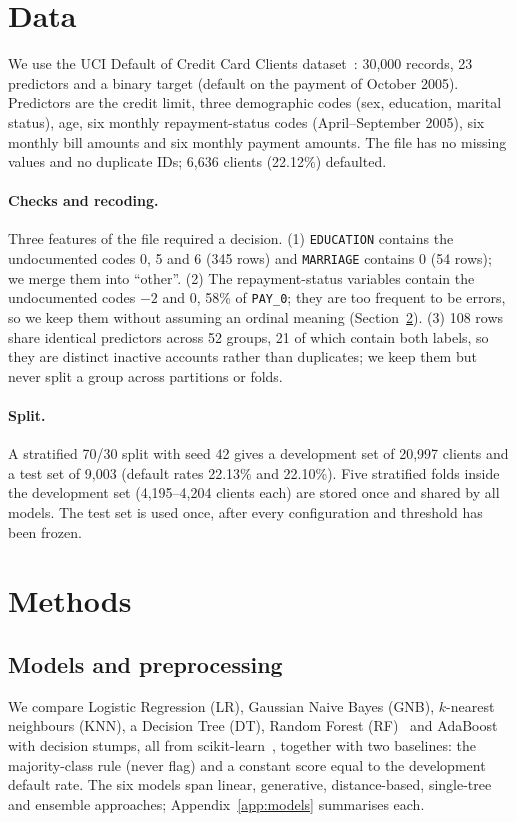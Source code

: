 \documentclass{article}
\begin{document}
\section{Data}
\label{sec:data}
We use the UCI Default of Credit Card Clients dataset~\citep{uci_default}: 30{,}000 records, 23 predictors and a binary target (default on the payment of October 2005). Predictors are the credit limit, three demographic codes (sex, education, marital status), age, six monthly repayment-status codes (April--September 2005), six monthly bill amounts and six monthly payment amounts. The file has no missing values and no duplicate IDs; 6{,}636 clients (22.12\%) defaulted.

\paragraph{Checks and recoding.} Three features of the file required a decision. (1) \texttt{EDUCATION} contains the undocumented codes 0, 5 and 6 (345 rows) and \texttt{MARRIAGE} contains 0 (54 rows); we merge them into ``other''. (2) The repayment-status variables contain the undocumented codes $-2$ and 0, 58\% of \texttt{PAY\_0}; they are too frequent to be errors, so we keep them without assuming an ordinal meaning (Section~\ref{sec:methods}). (3) 108 rows share identical predictors across 52 groups, 21 of which contain both labels, so they are distinct inactive accounts rather than duplicates; we keep them but never split a group across partitions or folds.

\paragraph{Split.} A stratified 70/30 split with seed 42 gives a development set of 20{,}997 clients and a test set of 9{,}003 (default rates 22.13\% and 22.10\%). Five stratified folds inside the development set (4{,}195--4{,}204 clients each) are stored once and shared by all models. The test set is used once, after every configuration and threshold has been frozen.

\section{Methods}
\label{sec:methods}
\subsection{Models and preprocessing}
We compare Logistic Regression (LR), Gaussian Naive Bayes (GNB), $k$-nearest neighbours (KNN), a Decision Tree (DT), Random Forest (RF)~\citep{breiman2001random} and AdaBoost~\citep{freund1997decision} with decision stumps, all from scikit-learn~\citep{pedregosa2011scikit}, together with two baselines: the majority-class rule (never flag) and a constant score equal to the development default rate. The six models span linear, generative, distance-based, single-tree and ensemble approaches; Appendix~\ref{app:models} summarises each.
\end{document}
